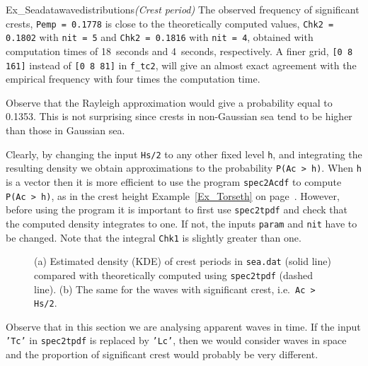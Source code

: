 \begin{cex}{Ex_Seadatawavedistributions}{\sl (Crest period)}
The observed frequency of significant crests, {\tt Pemp = 0.1778} is 
close to the theoretically computed values, {\tt Chk2 = 0.1802} with {\tt nit = 5} and 
{\tt Chk2 = 0.1816} with {\tt nit = 4},
obtained with computation times of 18~seconds and 4~seconds, respectively. 
A finer grid, {\tt [0 8 161]} instead of {\tt [0 8 81]} in \verb+f_tc2+, will give an 
almost exact agreement with the empirical frequency with four times the computation time. 

Observe that the Rayleigh approximation would give a
probability equal to 0.1353. This is not surprising since crests in
non-Gaussian sea tend to be higher than those in Gaussian sea.

Clearly, by changing the input {\tt Hs/2} to any other fixed level
{\tt h}, and integrating the resulting density we obtain
approximations to the probability {\tt P(Ac > h)}.
When {\tt h} is a vector then it is more efficient to use the program
{\tt spec2Acdf} to compute {\tt P(Ac > h)},
as in the crest height Example~\ref{Ex_Torseth} 
on page~\pageref{pageTorsethCrestHeight}. 
However, before using the
program it is important to first use {\tt spec2tpdf} and check that the
computed density integrates to one. If not, the inputs {\tt param} and
{\tt nit} have to be changed. Note that the integral {\tt Chk1} is slightly 
greater than one. 

\begin{figure}
%
\hfill
{}
\vspace{-3mm}
  \caption[Estimated and theoretical
density of crest periods in {\tt sea.dat}]{
(a) Estimated density (KDE) of crest periods in {\tt sea.dat} (solid line)
compared with theoretically
computed using {\tt spec2tpdf} (dashed line). (b) The same for the
waves with significant crest, i.e.\ {\tt Ac > Hs/2}.
}
\label{fig73}
\end{figure}

Observe that in this section we are analysing apparent waves
in time. If the input {\tt 'Tc'} in {\tt spec2tpdf} is replaced by
{\tt 'Lc'}, then we would consider waves in space and the proportion
of significant crest would probably be very different.
\end{cex}

